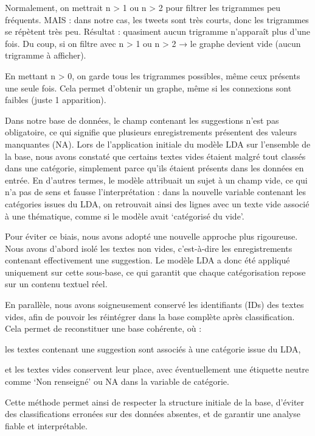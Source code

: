 \documentclass[
]{article}
\begin{document}
Normalement, on mettrait n \textgreater{} 1 ou n \textgreater{} 2 pour
filtrer les trigrammes peu fréquents. MAIS : dans notre cas, les tweets
sont très courts, donc les trigrammes se répètent très peu. Résultat :
quasiment aucun trigramme n'apparaît plus d'une fois. Du coup, si on
filtre avec n \textgreater{} 1 ou n \textgreater{} 2 → le graphe devient
vide (aucun trigramme à afficher).

En mettant n \textgreater{} 0, on garde tous les trigrammes possibles,
même ceux présents une seule fois. Cela permet d'obtenir un graphe, même
si les connexions sont faibles (juste 1 apparition).

Dans notre base de données, le champ contenant les suggestions n'est pas
obligatoire, ce qui signifie que plusieurs enregistrements présentent
des valeurs manquantes (NA). Lors de l'application initiale du modèle
LDA sur l'ensemble de la base, nous avons constaté que certains textes
vides étaient malgré tout classés dans une catégorie, simplement parce
qu'ils étaient présents dans les données en entrée. En d'autres termes,
le modèle attribuait un sujet à un champ vide, ce qui n'a pas de sens et
fausse l'interprétation : dans la nouvelle variable contenant les
catégories issues du LDA, on retrouvait ainsi des lignes avec un texte
vide associé à une thématique, comme si le modèle avait `catégorisé du
vide'.

Pour éviter ce biais, nous avons adopté une nouvelle approche plus
rigoureuse. Nous avons d'abord isolé les textes non vides, c'est-à-dire
les enregistrements contenant effectivement une suggestion. Le modèle
LDA a donc été appliqué uniquement sur cette sous-base, ce qui garantit
que chaque catégorisation repose sur un contenu textuel réel.

En parallèle, nous avons soigneusement conservé les identifiants (IDs)
des textes vides, afin de pouvoir les réintégrer dans la base complète
après classification. Cela permet de reconstituer une base cohérente, où
:

les textes contenant une suggestion sont associés à une catégorie issue
du LDA,

et les textes vides conservent leur place, avec éventuellement une
étiquette neutre comme `Non renseigné' ou NA dans la variable de
catégorie.

Cette méthode permet ainsi de respecter la structure initiale de la
base, d'éviter des classifications erronées sur des données absentes, et
de garantir une analyse fiable et interprétable.
\end{document}
